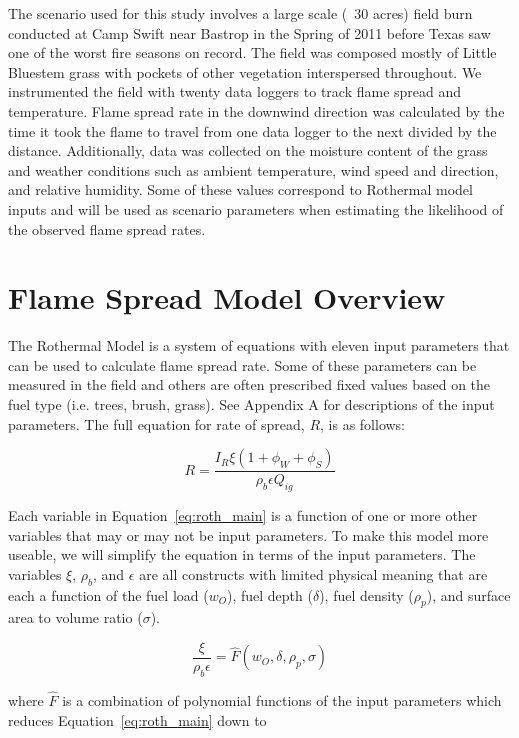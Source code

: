 \documentclass[11pt]{article}
\begin{document}
The scenario used for this study involves a large scale (~30 acres) field burn conducted at Camp Swift near Bastrop in the Spring of 2011 before Texas saw one of the worst fire seasons on record. The field was composed mostly of Little Bluestem grass with pockets of other vegetation interspersed throughout. We instrumented the field with twenty data loggers to track flame spread and temperature. Flame spread rate in the downwind direction was calculated by the time it took the flame to travel from one data logger to the next divided by the distance. Additionally, data was collected on the moisture content of the grass and weather conditions such as ambient temperature, wind speed and direction, and relative humidity. Some of these values correspond to Rothermal model inputs and will be used as scenario parameters when estimating the likelihood of the observed flame spread rates.


\section{Flame Spread Model Overview}

The Rothermal Model is a system of equations with eleven input parameters that can be used to calculate flame spread rate. Some of these parameters can be measured in the field and others are often prescribed fixed values based on the fuel type (i.e. trees, brush, grass). See Appendix A for descriptions of the input parameters. The full equation for rate of spread, $R$, is as follows:

\begin{equation}
R = \frac{I_R\xi(1+\phi_W+\phi_S)}{\rho_b\epsilon Q_{ig}}
\label{eq:roth_main}
\end{equation}

Each variable in Equation~\ref{eq:roth_main} is a function of one or more other variables that may or may not be input parameters. To make this model more useable, we will simplify the equation in terms of the input parameters. The variables $\xi$, $\rho_b$, and $\epsilon$ are all constructs with limited physical meaning that are each a function of the fuel load ($w_O$), fuel depth ($\delta$), fuel density ($\rho_p$), and surface area to volume ratio ($\sigma$). 

\begin{equation}
\frac{\xi}{\rho_b\epsilon} = \hat{F}(w_O, \delta, \rho_p, \sigma)
\label{eq:roth_fun}
\end{equation}

\noindent where $\hat{F}$ is a combination of polynomial functions of the input parameters which reduces Equation~\ref{eq:roth_main} down to
\end{document}

